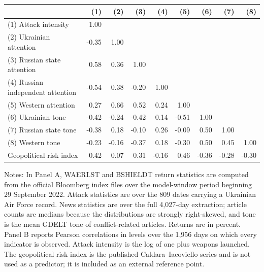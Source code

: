 \documentclass[12pt,a4paper]{article}
\begin{document}
\begin{table}[H]
\begin{threeparttable}
\footnotesize
\begin{tabular}{lrrrrrrrr}
\toprule
 & (1) & (2) & (3) & (4) & (5) & (6) & (7) & (8) \\
\midrule
(1) Attack intensity              &  1.00 &       &       &       &       &       &       &      \\
(2) Ukrainian attention           & -0.35 &  1.00 &       &       &       &       &       &      \\
(3) Russian state attention       &  0.58 &  0.36 &  1.00 &       &       &       &       &      \\
(4) Russian independent attention & -0.54 &  0.38 & -0.20 &  1.00 &       &       &       &      \\
(5) Western attention             &  0.27 &  0.66 &  0.52 &  0.24 &  1.00 &       &       &      \\
(6) Ukrainian tone                & -0.42 & -0.24 & -0.42 &  0.14 & -0.51 &  1.00 &       &      \\
(7) Russian state tone            & -0.38 &  0.18 & -0.10 &  0.26 & -0.09 &  0.50 &  1.00 &      \\
(8) Western tone                  & -0.23 & -0.16 & -0.37 &  0.18 & -0.30 &  0.50 &  0.45 & 1.00 \\
\midrule
Geopolitical risk index           &  0.42 &  0.07 &  0.31 & -0.16 &  0.46 & -0.36 & -0.28 & -0.30 \\
\bottomrule
\end{tabular}

\begin{tablenotes}
\small
\item Notes: In Panel A, WAERLST and BSHIELDT return statistics are computed from the official Bloomberg index files over the model-window period beginning 29 September 2022. Attack statistics are over the 809 dates carrying a Ukrainian Air Force record. News statistics are over the full 4,027-day extraction; article counts are medians because the distributions are strongly right-skewed, and tone is the mean GDELT tone of conflict-related articles. Returns are in percent. Panel B reports Pearson correlations in levels over the 1,956 days on which every indicator is observed. Attack intensity is the log of one plus weapons launched. The geopolitical risk index is the published Caldara--Iacoviello series and is not used as a predictor; it is included as an external reference point.
\end{tablenotes}
\end{threeparttable}
\end{table}
\end{document}
